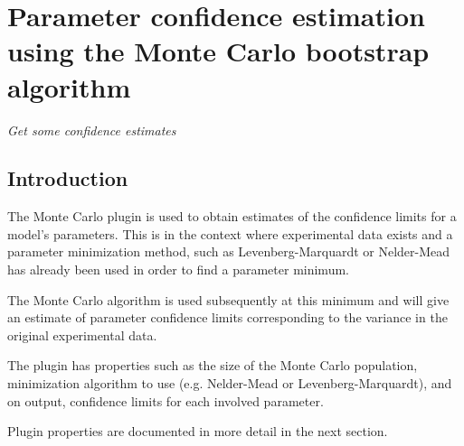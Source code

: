 
\newcommand{\pname}{Monte Carlo}

\chapter*{Parameter confidence estimation using the Monte Carlo bootstrap algorithm}
\setcounter{chapter}{1}
\emph{Get some confidence estimates}
\section{Introduction}
The Monte Carlo plugin is used to obtain estimates of the confidence limits for a model's parameters. This is in the context where experimental data exists and a parameter minimization method, such as Levenberg-Marquardt or Nelder-Mead has already been used in order to find a parameter minimum.

The Monte Carlo algorithm is used subsequently at this minimum and will give an estimate of parameter confidence limits corresponding to the variance in the original experimental data.

The plugin has properties such as the size of the Monte Carlo population, minimization algorithm to use (e.g. Nelder-Mead or Levenberg-Marquardt), and on output, confidence limits for each involved parameter.

Plugin properties are documented in more detail in the next section.

